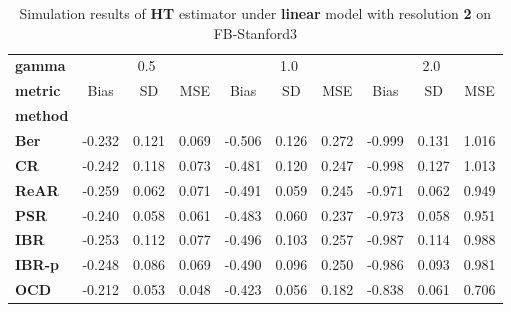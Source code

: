 \begin{table}
\centering
\caption{Simulation results of \textbf{HT} estimator under \textbf{linear} model with resolution \textbf{2} on FB-Stanford3}
\begin{tabular}{lccccccccc}
\toprule
\textbf{gamma} & \multicolumn{3}{c}{0.5} & \multicolumn{3}{c}{1.0} & \multicolumn{3}{c}{2.0} \\
\textbf{metric} &   Bias &     SD &    MSE &   Bias &     SD &    MSE &   Bias &     SD &    MSE \\
\textbf{method} &        &        &        &        &        &        &        &        &        \\
\midrule
\textbf{Ber} & -0.232 &  0.121 &  0.069 & -0.506 &  0.126 &  0.272 & -0.999 &  0.131 &  1.016 \\
\textbf{CR} & -0.242 &  0.118 &  0.073 & -0.481 &  0.120 &  0.247 & -0.998 &  0.127 &  1.013 \\
\textbf{ReAR} & -0.259 &  0.062 &  0.071 & -0.491 &  0.059 &  0.245 & -0.971 &  0.062 &  0.949 \\
\textbf{PSR} & -0.240 &  0.058 &  0.061 & -0.483 &  0.060 &  0.237 & -0.973 &  0.058 &  0.951 \\
\textbf{IBR} & -0.253 &  0.112 &  0.077 & -0.496 &  0.103 &  0.257 & -0.987 &  0.114 &  0.988 \\
\textbf{IBR-p} & -0.248 &  0.086 &  0.069 & -0.490 &  0.096 &  0.250 & -0.986 &  0.093 &  0.981 \\
\textbf{OCD} & -0.212 &  0.053 &  0.048 & -0.423 &  0.056 &  0.182 & -0.838 &  0.061 &  0.706 \\
\bottomrule
\end{tabular}
\end{table}

